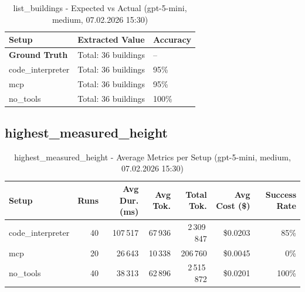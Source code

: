 \documentclass[a4paper,11pt]{article}
\begin{document}
\begin{table}[H]
\centering
\scriptsize
\caption{list\_buildings - Expected vs Actual (gpt-5-mini, medium, 07.02.2026 15:30)}
\begin{tabular}{l l l}
\toprule
Setup & Extracted Value & Accuracy \\
\midrule
\textbf{Ground Truth} & Total: 36 buildings & -- \\
\midrule
code\_interpreter & Total: 36 buildings & 95\% \\
mcp & Total: 36 buildings & 95\% \\
no\_tools & Total: 36 buildings & 100\% \\
\bottomrule
\end{tabular}
\end{table}

\clearpage

\subsection{highest\_measured\_height}

\begin{table}[H]
\centering
\scriptsize
\caption{highest\_measured\_height - Average Metrics per Setup (gpt-5-mini, medium, 07.02.2026 15:30)}
\label{tab:combined\_highest\_measured\_height\_metrics\_20260207}
\begin{tabular}{l r r r r r r}
\toprule
Setup & Runs & Avg Dur. (ms) & Avg Tok. & Total Tok. & Avg Cost (\$) & Success Rate \\
\midrule
code\_interpreter & 40 & 107\,517 & 67\,936 & 2\,309\,847 & \$0.0203 & 85\% \\
mcp & 20 & 26\,643 & 10\,338 & 206\,760 & \$0.0045 & 0\% \\
no\_tools & 40 & 38\,313 & 62\,896 & 2\,515\,872 & \$0.0201 & 100\% \\
\bottomrule
\end{tabular}
\end{table}
\end{document}
